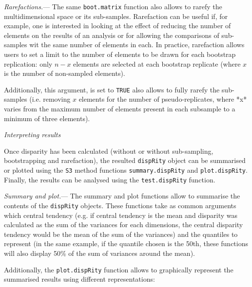 \documentclass[12pt,letterpaper]{article}
\renewcommand{\subsection}[1]{%
\bigskip
\begin{center}
\begin{large}
\normalfont\itshape #1
\end{large}
\end{center}}
\renewcommand{\subsubsection}[1]{%
\vspace{2ex}
\noindent
\textit{#1.}---}
\newcommand{\disp}{\texttt{dispRity} }
\begin{document}
\subsubsection{Rarefactions}
The same \texttt{boot.matrix} function also allows to rarefy the multidimensional space or its sub-samples.
Rarefaction can be useful if, for example, one is interested in looking at the effect of reducing the number of elements on the results of an analysis or for allowing the comparisons of sub-samples wit the same number of elements in each.
In practice, rarefaction allows users to set a limit to the number of elements to be drawn for each bootstrap replication: only $n-x$ elements are selected at each bootstrap replicate (where $x$ is the number of non-sampled elements).

Additionally, this argument, is set to \texttt{TRUE} also allows to fully rarefy the sub-samples (i.e. removing $x$ elements for the number of pseudo-replicates, where *x* varies from the maximum number of elements present in each subsample to a minimum of three elements).

\subsection{Interpreting results}
Once disparity has been calculated (without or without sub-sampling, bootstrapping and rarefaction), the resulted \disp object can be summarised or plotted using the \texttt{S3} method functions \texttt{summary.dispRity} and \texttt{plot.dispRity}.
Finally, the results can be analysed using the \texttt{test.dispRity} function.

\subsubsection{Summary and plot}
The summary and plot functions allow to summarise the contents of the \disp objects.
These functions take as common arguments which central tendency (e.g. if central tendency is the mean and disparity was calculated as the sum of the variances for each dimensions, the central disparity tendency would be the mean of the sum of the variances) and the quantiles to represent (in the same example, if the quantile chosen is the 50th, these functions will also display 50\% of the sum of variances around the mean).

Additionally, the \texttt{plot.dispRity} function allows to graphically represent the summarised results using different representations:
\end{document}
